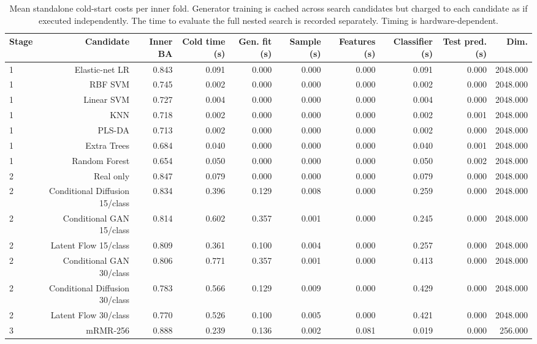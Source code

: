 \begin{table}[t]
\centering
\caption{Mean standalone cold-start costs per inner fold. Generator training is cached across search candidates but charged to each candidate as if executed independently. The time to evaluate the full nested search is recorded separately. Timing is hardware-dependent.}
\label{tab:computational_effort}
\footnotesize
\setlength{\tabcolsep}{4pt}
\begin{tabular}{lrrrrrrrrr}
\toprule
Stage & Candidate & Inner BA & Cold time (s) & Gen. fit (s) & Sample (s) & Features (s) & Classifier (s) & Test pred. (s) & Dim. \\
\midrule
1 & Elastic-net LR & 0.843 & 0.091 & 0.000 & 0.000 & 0.000 & 0.091 & 0.000 & 2048.000 \\
1 & RBF SVM & 0.745 & 0.002 & 0.000 & 0.000 & 0.000 & 0.002 & 0.000 & 2048.000 \\
1 & Linear SVM & 0.727 & 0.004 & 0.000 & 0.000 & 0.000 & 0.004 & 0.000 & 2048.000 \\
1 & KNN & 0.718 & 0.002 & 0.000 & 0.000 & 0.000 & 0.002 & 0.001 & 2048.000 \\
1 & PLS-DA & 0.713 & 0.002 & 0.000 & 0.000 & 0.000 & 0.002 & 0.000 & 2048.000 \\
1 & Extra Trees & 0.684 & 0.040 & 0.000 & 0.000 & 0.000 & 0.040 & 0.001 & 2048.000 \\
1 & Random Forest & 0.654 & 0.050 & 0.000 & 0.000 & 0.000 & 0.050 & 0.002 & 2048.000 \\
2 & Real only & 0.847 & 0.079 & 0.000 & 0.000 & 0.000 & 0.079 & 0.000 & 2048.000 \\
2 & Conditional Diffusion 15/class & 0.834 & 0.396 & 0.129 & 0.008 & 0.000 & 0.259 & 0.000 & 2048.000 \\
2 & Conditional GAN 15/class & 0.814 & 0.602 & 0.357 & 0.001 & 0.000 & 0.245 & 0.000 & 2048.000 \\
2 & Latent Flow 15/class & 0.809 & 0.361 & 0.100 & 0.004 & 0.000 & 0.257 & 0.000 & 2048.000 \\
2 & Conditional GAN 30/class & 0.806 & 0.771 & 0.357 & 0.001 & 0.000 & 0.413 & 0.000 & 2048.000 \\
2 & Conditional Diffusion 30/class & 0.783 & 0.566 & 0.129 & 0.009 & 0.000 & 0.429 & 0.000 & 2048.000 \\
2 & Latent Flow 30/class & 0.770 & 0.526 & 0.100 & 0.005 & 0.000 & 0.421 & 0.000 & 2048.000 \\
3 & mRMR-256 & 0.888 & 0.239 & 0.136 & 0.002 & 0.081 & 0.019 & 0.000 & 256.000 \\

\end{tabular}
\end{table}
